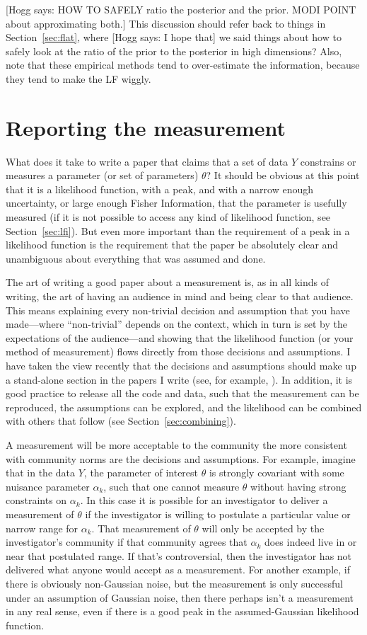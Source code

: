 \documentclass{article}
\newcommand{\sectionname}{Section}
\newcommand{\secref}[1]{\sectionname~\ref{#1}}
\newcommand{\hogg}[1]{{\color{blue}[Hogg says: {#1}]}}
\begin{document}
\hogg{HOW TO SAFELY ratio the posterior and the prior. MODI POINT about approximating both.}
This discussion should refer back to things in \secref{sec:flat}, where \hogg{I hope that} we said things about how to safely look at the ratio of the prior to the posterior in high dimensions?
Also, note that these empirical methods tend to over-estimate the information, because they tend to make the LF wiggly.

\section{Reporting the measurement}\label{sec:reporting}
What does it take to write a paper that claims that a set of data $Y$ constrains or measures a parameter (or set of parameters) $\theta$?
It should be obvious at this point that it is a likelihood function, with a peak, and with a narrow enough uncertainty, or large enough Fisher Information, that the parameter is usefully measured
(if it is not possible to access any kind of likelihood function, see \secref{sec:lfi}).
But even more important than the requirement of a peak in a likelihood function is the requirement that the paper be absolutely clear and unambiguous about everything that was assumed and done.

The art of writing a good paper about a measurement is, as in all kinds of writing, the art of having an audience in mind and being clear to that audience.
This means explaining every non-trivial decision and assumption that you have made---where ``non-trivial'' depends on the context, which in turn is set by the expectations of the audience---and showing that the likelihood function (or your method of measurement) flows directly from those decisions and assumptions.
I have taken the view recently that the decisions and assumptions should make up a stand-alone section in the papers I write (see, for example, \cite{frizzle}).
In addition, it is good practice to release all the code and data, such that the measurement can be reproduced, the assumptions can be explored, and the likelihood can be combined with others that follow (see \secref{sec:combining}).

A measurement will be more acceptable to the community the more consistent with community norms are the decisions and assumptions.
For example, imagine that in the data $Y$, the parameter of interest $\theta$ is strongly covariant with some nuisance parameter $\alpha_k$,
such that one cannot measure $\theta$ without having strong constraints on $\alpha_k$.
In this case it is possible for an investigator to deliver a measurement of $\theta$ if the investigator is willing to postulate a particular value or narrow range for $\alpha_k$.
That measurement of $\theta$ will only be accepted by the investigator's community if that community agrees that $\alpha_k$ does indeed live in or near that postulated range.
If that's controversial, then the investigator has not delivered what anyone would accept as a measurement.
For another example, if there is obviously non-Gaussian noise, but the measurement is only successful under an assumption of Gaussian noise, then there perhaps isn't a measurement in any real sense, even if there is a good peak in the assumed-Gaussian likelihood function.
\end{document}
